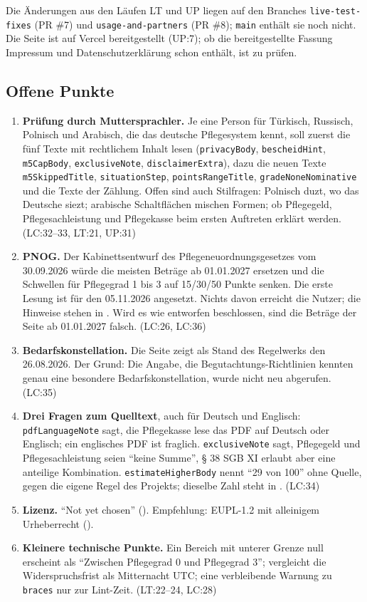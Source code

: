 \documentclass[10pt,parskip=half-]{scrartcl}
\begin{document}
Die Änderungen aus den Läufen LT und UP liegen auf den Branches \texttt{live-test-fixes}
(PR \#7) und \texttt{usage-and-partners} (PR \#8); \texttt{main} enthält sie noch nicht. Die
Seite ist auf Vercel bereitgestellt (UP:7); ob die bereitgestellte Fassung Impressum und
Datenschutzerklärung schon enthält, ist zu prüfen.

\subsection{Offene Punkte}
\begin{enumerate}
  \item \textbf{Prüfung durch Muttersprachler.} Je eine Person für Türkisch, Russisch,
    Polnisch und Arabisch, die das deutsche Pflegesystem kennt, soll zuerst die fünf Texte mit
    rechtlichem Inhalt lesen (\texttt{privacyBody}, \texttt{bescheidHint}, \texttt{m5CapBody},
    \texttt{exclusiveNote}, \texttt{disclaimerExtra}), dazu die neuen Texte
    \texttt{m5SkippedTitle}, \texttt{situationStep}, \texttt{pointsRangeTitle},
    \texttt{gradeNoneNominative} und die Texte der Zählung. Offen sind auch Stilfragen: Polnisch
    duzt, wo das Deutsche siezt; arabische Schaltflächen mischen Formen; ob Pflegegeld,
    Pflegesachleistung und Pflegekasse beim ersten Auftreten erklärt werden. (LC:32--33, LT:21,
    UP:31)
  \item \textbf{PNOG.} Der Kabinettsentwurf des Pflegeneuordnungsgesetzes vom 30.09.2026 würde
    die meisten Beträge ab 01.01.2027 ersetzen und die Schwellen für Pflegegrad 1 bis 3 auf
    15/30/50 Punkte senken. Die erste Lesung ist für den 05.11.2026 angesetzt. Nichts davon
    erreicht die Nutzer; die Hinweise stehen in . Wird es wie
    entworfen beschlossen, sind die Beträge der Seite ab 01.01.2027 falsch. (LC:26, LC:36)
  \item \textbf{Bedarfskonstellation.} Die Seite zeigt als Stand des Regelwerks den 26.08.2026.
    Der Grund: Die Angabe, die Begutachtungs-Richtlinien kennten genau eine besondere
    Bedarfskonstellation, wurde nicht neu abgerufen. (LC:35)
  \item \textbf{Drei Fragen zum Quelltext}, auch für Deutsch und Englisch:
    \texttt{pdfLanguageNote} sagt, die Pflegekasse lese das PDF auf Deutsch oder Englisch; ein
    englisches PDF ist fraglich. \texttt{exclusiveNote} sagt, Pflegegeld und
    Pflegesachleistung seien \enquote{keine Summe}, § 38 SGB XI erlaubt aber eine anteilige
    Kombination. \texttt{estimateHigherBody} nennt \enquote{29 von 100} ohne Quelle, gegen die
    eigene Regel des Projekts; dieselbe Zahl steht in . (LC:34)
  \item \textbf{Lizenz.} \enquote{Not yet chosen} (). Empfehlung: EUPL-1.2 mit
    alleinigem Urheberrecht ().
  \item \textbf{Kleinere technische Punkte.} Ein Bereich mit unterer Grenze null erscheint als
    \enquote{Zwischen Pflegegrad 0 und Pflegegrad 3};  vergleicht
    die Widerspruchsfrist als Mitternacht UTC; eine verbleibende Warnung zu \texttt{braces} nur
    zur Lint-Zeit. (LT:22--24, LC:28)
\end{enumerate}
\end{document}
